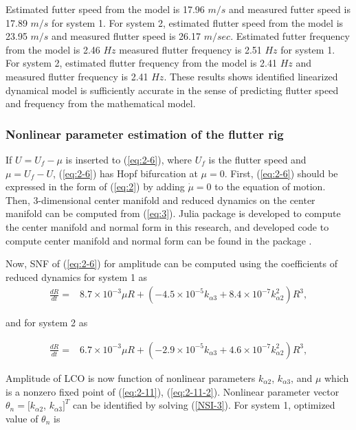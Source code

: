 \documentclass[openacc]{rsproca_new}%
\theoremstyle{own}
\newcommand{\Eref}[1]{(\ref{#1})}
\begin{document}
Estimated futter speed from the model is 17.96 $m/s$ and measured futter speed is 17.89 $m/s$ for system 1. For system 2, estimated flutter speed from the model is 23.95 $m/s$ and measured flutter speed is 26.17 $m/sec$. Estimated futter frequency from the model is 2.46 $Hz$ measured flutter frequency is 2.51 $Hz$ for system 1. For system 2, estimated flutter frequency from the model is 2.41 $Hz$ and measured flutter frequency is 2.41 $Hz$. These results shows identified linearized dynamical model is sufficiently accurate in the sense of predicting flutter speed and frequency from the mathematical model.

\subsubsection{Nonlinear parameter estimation of the flutter rig}\label{nonlinear}

If $U=U_f-\mu$ is inserted to \Eref{eq:2-6}, where $U_f$ is the flutter speed and $\mu=U_f-U$, \Eref{eq:2-6} has Hopf bifurcation at $\mu=0$. First, \Eref{eq:2-6} should be expressed in the form of \Eref{eq:2} by adding $\dot \mu=0$ to the equation of motion. Then, 3-dimensional center manifold and reduced dynamics on the center manifold can be computed from \Eref{eq:3}. Julia \cite{bezanson2017julia} package is developed to compute the center manifold and normal form in this research, and developed code to compute center manifold and normal form can be found in the package \cite{hopfNF}.

Now, SNF of \Eref{eq:2-6} for amplitude can be computed using the coefficients of reduced dynamics for system 1 as
\begin{align}\label{eq:2-11}
\frac{dR}{dt}=&8.7\times 10^{-3}\mu R+(- 4.5 \times 10^{-5}  k_{\alpha 3} + 8.4 \times 10^{-7} k_{\alpha 2}^2)R^3,
\end{align}

\noindent and for system 2 as

\begin{align}\label{eq:2-11-2}
\frac{dR}{dt}=&6.7\times 10^{-3}\mu R+(- 2.9 \times 10^{-5}  k_{\alpha 3} + 4.6 \times 10^{-7} k_{\alpha 2}^2)R^3,
\end{align}

\noindent Amplitude of LCO is now function of nonlinear parameters $k_{\alpha2}$, $k_{\alpha3}$, and $\mu$ which is a nonzero fixed point of \Eref{eq:2-11}, \Eref{eq:2-11-2}. Nonlinear parameter vector $\theta_n=[k_{\alpha2}$, $k_{\alpha3}]^T$ can be identified by solving \Eref{NSI-3}. For system 1, optimized value of $\theta_n$ is
\end{document}
